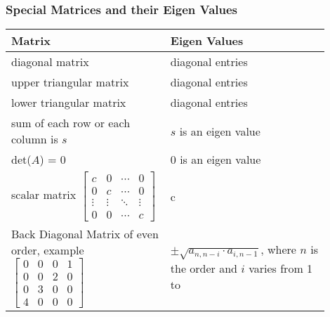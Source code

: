 \documentclass[a4paper, titlepage]{article}
\begin{document}
        \subsubsection{Special Matrices and their Eigen Values}
            \begin{center}
                \begin{tabular}{ |p{0.45\linewidth}|p{0.45\linewidth}| }
                    \hline
                        \textbf{Matrix} & \textbf{Eigen Values} \\
                    \hline
                        diagonal matrix & diagonal entries \\
                    \hline
                        upper triangular matrix & diagonal entries \\
                    \hline
                        lower triangular matrix & diagonal entries \\
                    \hline
                        sum of each row or each column is $s$ & $s$ is an 
                        eigen value \\
                    \hline
                        det($A$) = 0 & $0$ is an eigen value \\
                    \hline
                    scalar matrix 
                        $\begin{bmatrix*}
                            c & 0 & \cdots & 0 \\
                            0 & c & \cdots & 0 \\
                            \vdots & \vdots & \ddots & \vdots \\
                            0 & 0 & \cdots & c
                        \end{bmatrix*}$ 
                    & %
                        c \\
                    \hline
                    Back Diagonal Matrix of even order, example
                        $\begin{bmatrix*}
                            0 & 0 & 0 & 1 \\
                            0 & 0 & 2 & 0 \\
                            0 & 3 & 0 & 0 \\
                            4 & 0 & 0 & 0 
                        \end{bmatrix*}$
                    & %
                        $\pm\sqrt{a_{n, n-i}\cdot a_{i, n-1}}$, where 
                        $n$ is the order and $i$ varies from 1 to

\end{tabular}
\end{center}
\end{document}
